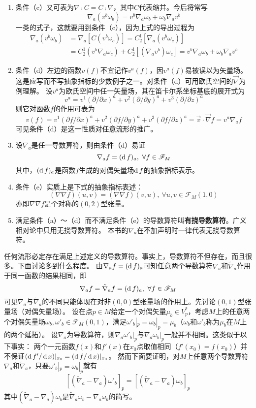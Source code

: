 \begin{note}
\begin{enumerate}[（1）]
\item 条件（c）又可表为$\nabla \comp C = C \comp \nabla$，其中$C$代表缩并。今后将常写
$$\nabla_a(v^b\omega_b) = v^b\nabla_a\omega_b + \omega_b\nabla_av^b$$
一类的式子，这就要用到条件（c），因为上式的导出过程为
$$\begin{aligned}
\nabla_a(v^b\omega_b) & = \nabla_a[C(v^b\omega_c)] = C^1_2[\nabla_a(v^b\omega_c)] \\
& = C^1_2(v^b\nabla_a\omega_c) + C^1_2[(\nabla_av^b)\omega_c] = v^b\nabla_a\omega_b + \omega_b\nabla_av^b
\end{aligned}$$
\item 条件（d）左边的函数$v(f)$不宜记作$v^a(f)$，因$v^a(f)$易被误以为矢量场。
这是应写而不写抽象指标的少数例子之一。对条件（d）可用欧氏空间的$\vec{\nabla}$为例理解。
设$v^a$为欧氏空间中任一矢量场，其在笛卡尔系坐标基底的展开式为
$$v^a = v^1(\partial / \partial x)^a + v^2(\partial / \partial y)^a + v^3(\partial / \partial z)^a$$
则它对函数$f$的作用可表为
$$v(f) = v^1(\partial f / \partial x)^a + v^2(\partial f / \partial y)^a + v^3(\partial f / \partial z)^a = \vec{v}\cdot\vec{\nabla}f = v^a\nabla_af$$
可见条件（d）是这一性质对任意流形的推广。
\item 设$\nabla_a$是任一导数算符，则由条件（d）易证
$$\nabla_af = (\operatorname{d} f)_a, ~ \forall f \in \mathscr{F}_M$$
其中，$(\operatorname{d} f)_a$是函数$f$生成的对偶矢量场$\operatorname{d} f$的抽象指标表示。
\item 条件（e）实质上是下式的抽象指标表述：
$$(\nabla\nabla f)(u, v) = (\nabla\nabla f)(v, u), ~ \forall u, v \in \mathscr{F}_M(1, 0)$$
亦即$\nabla\nabla f$是个对称的$(0, 2)$型张量。
\item 满足条件（a）～（d）而不满足条件（e）的导数算符叫\textbf{有挠导数算符}。广义相对论中只用无挠导数算符。
本书的$\nabla_a$在不加声明时一律代表无挠导数算符。
\end{enumerate}
\end{note}

任何流形必定存在满足上述定义的导数算符。事实上，导数算符不但存在，而且很多。下面讨论多到什么程度。
由$\nabla_af = (\operatorname{d} f)_a$可知任意两个导数算符$\nabla_a$和$\tilde\nabla_a$作用于同一函数的结果相同，即
$$\nabla_af = \tilde\nabla_af = (\operatorname{d} f)_a, ~ \forall f \in \mathscr{F}_M$$
可见$\nabla_a$与$\tilde\nabla_a$的不同只能体现在对非$(0, 0)$型张量场的作用上。先讨论$(0, 1)$型张量场（对偶矢量场）。
设在点$p \in M$给定一个对偶矢量$\mu_b \in V_p^*$，考虑$M$上的任意两个对偶矢量场$\omega_b, \omega'_b \in \mathscr{F}_M(0, 1)$，满足$\omega'_b|_p = \omega_b|_p = \mu_b$（$\omega_b$和$\omega'_b$称为$\mu_b$在$M$上的两个延拓）。
设$\nabla_a$为导数算符，则$\nabla_a\omega'_b|_p$与$\nabla_a\omega_b|_p$一般并不相同。这类似于以下事实：
两个一元函数$f(x)$和$f'(x)$在$x_0$点取值相同（$f'(x_0) = f(x_0)$）并不保证$(\operatorname{d} f' /\operatorname{d} x)|_{x_0} = (\operatorname{d} f /\operatorname{d} x)|_{x_0}$。
然而下面要证明，对$M$上任意两个导数算符$\nabla_a$和$\tilde\nabla_a$，只要$\omega'_b|_p = \omega_b|_p$就有
$$[(\tilde\nabla_a - \nabla_a)\omega'_b]_p = [(\tilde\nabla_a - \nabla_a)\omega_b]_p$$
其中$(\tilde\nabla_a - \nabla_a)\omega_b$是$\tilde\nabla_a\omega_b - \nabla_a\omega_b$的简写。

